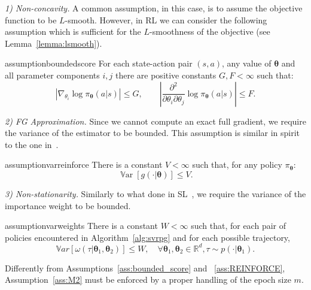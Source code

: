 \documentclass{article}
\theoremstyle{remark}
\theoremstyle{definition}
\newcommand{\realspace}{\mathbb R}      %
\DeclareMathOperator*{\Var}{\mathbb{V}ar}
\newcommand{\vtheta}{\boldsymbol{\theta}}
\newcommand{\pol}{\pi_{\vtheta}}
\newcommand{\VARRF}{V}
\newcommand{\GRADLOG}{G}
\newcommand{\VARIS}{W}
\newcommand{\HESSLOG}{F}
\begin{document}
\textit{1) Non-concavity.} A common assumption, in this case, is to assume the objective function to be $L$-smooth.
However, in RL we can consider the following assumption which is sufficient for the $L$-smoothness of the objective (see Lemma~\ref{lemma:lsmooth}).
	\begin{restatable}{assumption}{boundedscore}\label{ass:bounded_score}
		For each state-action pair $(s,a)$, any value of $\vtheta$ and all parameter components $i,j$ there are positive constants $G,F<\infty$ such that:
\[
		\left|\nabla_{\theta_i}\log\pi_{\vtheta}(a\vert s)\right| \leq \GRADLOG, \qquad
        \left|\frac{\partial^2}{\partial\theta_i\partial\theta_j}\log\pi_{\vtheta}(a \vert s)\right| \leq \HESSLOG.
\]
	\end{restatable}

\textit{2) FG Approximation.}
Since we cannot compute an exact full gradient, we require the variance of the estimator to be bounded.
This assumption is similar in spirit to the one in~\citep{harikandeh2015stopwasting}.
	\begin{restatable}{assumption}{varreinforce}\label{ass:REINFORCE}
		There is a constant $V<\infty$ such that, for any policy $\pol$:
		\[
			\Var\left[g(\cdot\vert\vtheta)\right] \leq \VARRF.
		\]
	\end{restatable}

\textit{3) Non-stationarity.} 
Similarly to what done in SL~\citep{cortes2010learning}, we require the variance of the importance weight to be bounded.
	\begin{restatable}{assumption}{varweights}\label{ass:M2}
		There is a constant $W<\infty$ such that, for each pair of policies encountered in Algorithm~\ref{alg:svrpg} and for each possible trajectory,
		\[
                \mathbb{V}ar\left[\omega(\tau| \vtheta_1, \vtheta_2)\right] \leq \VARIS, \quad \forall \vtheta_1,\vtheta_2 \in \realspace^d , \tau \sim p(\cdot|\vtheta_1).
		\]
	\end{restatable}
Differently from Assumptions~\ref{ass:bounded_score} and ~\ref{ass:REINFORCE}, Assumption~\ref{ass:M2} must be enforced by a proper handling of the epoch size $m$.
\end{document}
